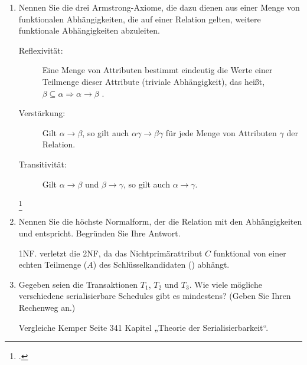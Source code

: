 \documentclass{bschlangaul-aufgabe}
\begin{document}
\begin{enumerate}

\item Nennen Sie die drei Armstrong-Axiome, die dazu dienen aus einer
Menge von funktionalen Abhängigkeiten, die auf einer Relation gelten,
weitere funktionale Abhängigkeiten abzuleiten.

\begin{bAntwort}
\begin{description}
\item[Reflexivität:]
%
Eine Menge von Attributen bestimmt eindeutig die Werte einer Teilmenge
dieser Attribute (triviale Abhängigkeit), das heißt,
$\beta \subseteq \alpha \Rightarrow \alpha \rightarrow \beta$ .

\item[Verstärkung:]
%
Gilt
$\alpha \rightarrow \beta$, so gilt auch
$\alpha \gamma \rightarrow \beta \gamma$
für jede Menge von Attributen
$\gamma$ der
Relation.

\item[Transitivität:]
%
Gilt
$\alpha \rightarrow \beta$
und
$\beta \rightarrow \gamma$,
so gilt auch
$\alpha \rightarrow \gamma$.
\end{description}
\footcite[Axiome von Armstrong]{wiki:funktionale-abhängigkeit}
\end{bAntwort}


\item Nennen Sie die höchste Normalform, der die Relation  mit den Abhängigkeiten  und 
entspricht. Begründen Sie Ihre Antwort.

\begin{bAntwort}
1NF.  verletzt die 2NF, da das Nichtprimärattribut $C$
funktional von einer echten Teilmenge ($A$) des Schlüsselkandidaten
() abhängt.
\end{bAntwort}


\item Gegeben seien die Transaktionen $T_1$, $T_2$ und $T_3$. Wie viele
mögliche verschiedene serialisierbare Schedules gibt es mindestens?
(Geben Sie Ihren Rechenweg an.)

\begin{bAntwort}
Vergleiche Kemper Seite 341 Kapitel „Theorie der Serialisierbarkeit“.
\end{bAntwort}

\end{enumerate}
\end{document}

